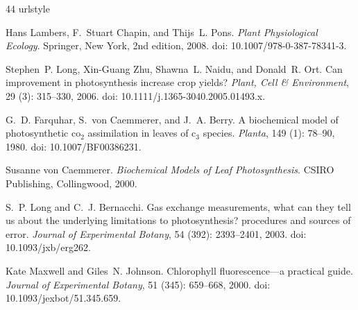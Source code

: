 \documentclass[11pt, letterpaper]{article}
\begin{document}
\begin{thebibliography}{44}
\providecommand{\natexlab}[1]{#1}
\providecommand{\url}[1]{\texttt{#1}}
\expandafter\ifx\csname urlstyle\endcsname\relax
  \providecommand{\doi}[1]{doi: #1}\else
  \providecommand{\doi}{doi: \begingroup \urlstyle{rm}\Url}\fi

Hans Lambers, F.~Stuart Chapin, and Thijs~L. Pons.
\newblock \emph{Plant Physiological Ecology}.
\newblock Springer, New York, 2nd edition, 2008.
\newblock \doi{10.1007/978-0-387-78341-3}.

Stephen~P. Long, Xin-Guang Zhu, Shawna~L. Naidu, and Donald~R. Ort.
\newblock Can improvement in photosynthesis increase crop yields?
\newblock \emph{Plant, Cell \& Environment}, 29 (3): 315--330, 2006.
\newblock \doi{10.1111/j.1365-3040.2005.01493.x}.

G.~D. Farquhar, S.~von Caemmerer, and J.~A. Berry.
\newblock A biochemical model of photosynthetic co$_2$ assimilation in leaves of c$_3$ species.
\newblock \emph{Planta}, 149 (1): 78--90, 1980.
\newblock \doi{10.1007/BF00386231}.

Susanne von Caemmerer.
\newblock \emph{Biochemical Models of Leaf Photosynthesis}.
\newblock CSIRO Publishing, Collingwood, 2000.

S.~P. Long and C.~J. Bernacchi.
\newblock Gas exchange measurements, what can they tell us about the underlying limitations to photosynthesis? procedures and sources of error.
\newblock \emph{Journal of Experimental Botany}, 54 (392): 2393--2401, 2003.
\newblock \doi{10.1093/jxb/erg262}.

Kate Maxwell and Giles~N. Johnson.
\newblock Chlorophyll fluorescence---a practical guide.
\newblock \emph{Journal of Experimental Botany}, 51 (345): 659--668, 2000.
\newblock \doi{10.1093/jexbot/51.345.659}.


\end{thebibliography}
\end{document}
